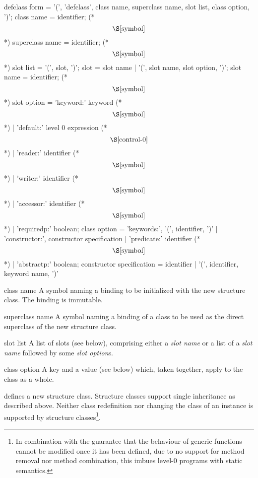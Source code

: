 \begin{optDefinition}
\label{defclass}
\Syntax
\savesyntax{}\vbox{\small\syntax
defclass form
   = '(', 'defclass', class name, superclass name,
     slot list, {class option}, ')';
class name
   = identifier; (* \[\S\ref{symbol}\] *)
superclass name
   = identifier; (* \[\S\ref{symbol}\] *)
slot list
   = '(', {slot}, ')';
slot
   = slot name
   | '(', slot name, {slot option}, ')';
slot name
   = identifier; (* \[\S\ref{symbol}\] *)
slot option
   = 'keyword:' keyword (* \[\S\ref{symbol}\] *)
   | 'default:' level 0 expression (* \[\S\ref{control-0}\] *)
   | 'reader:' identifier (* \[\S\ref{symbol}\] *)
   | 'writer:' identifier (* \[\S\ref{symbol}\] *)
   | 'accessor:' identifier (* \[\S\ref{symbol}\] *)
   | 'requiredp:' boolean;
class option
   = 'keywords:', '(', {identifier}, ')'
   | 'constructor:', constructor specification
   | 'predicate:' identifier (* \[\S\ref{symbol}\] *)
   | 'abstractp:' boolean;
constructor specification
   = identifier
   | '(', identifier, {keyword name}, ')'
\endsyntax}
\label{defclass-syntax-table}

\begin{arguments}
    \item[class name] A symbol naming a binding to be initialized with the new
    structure class. The binding is immutable.

    \item[superclass name] A symbol naming a binding of a class to be used as
    the direct superclass of the new structure class.

    \item[slot list] A list of slots (see below), comprising either a {\em slot
        name} or a list of a {\em slot name} followed by some {\em slot
        option}s.

    \item[class option] A key and a value (see below) which, taken together,
    apply to the class as a whole.
\end{arguments}
%
\remarks%
 defines a new structure class. Structure classes support
single inheritance as described above. Neither class redefinition nor changing
the class of an instance is supported by structure classes\footnote{In
    combination with the guarantee that the behaviour of generic functions
    cannot be modified once it has been defined, due to no support for method
    removal nor method combination, this imbues level-0 programs with static
    semantics.}.


\end{optDefinition}
